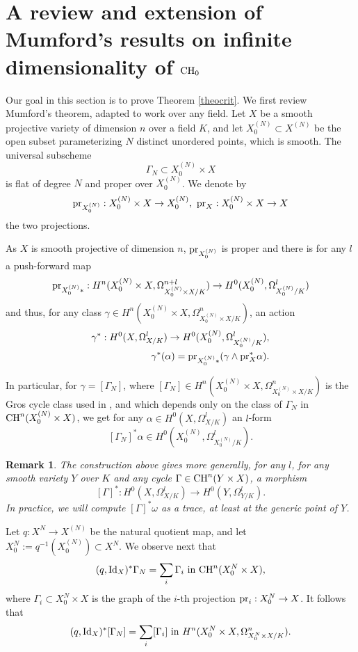 \documentclass[10pt]{article}
\newtheorem{rema}[theo]{Remark}
\begin{document}
\section{\label{secmumford} A review and extension of Mumford's results on infinite dimensionality  of ${\rm CH}_0$}
Our goal in this section is to prove Theorem  \ref{theocrit}.
We first  review  Mumford's theorem, adapted  to work over any field.   Let $X$ be  a smooth projective variety of dimension $n$ over a field $K$,  and let $X^{(N)}_0\subset X^{(N)}$ be the  open subset parameterizing $N$ distinct unordered points, which is smooth. The universal subscheme
$$\Gamma_N\subset X^{(N)}_0\times X$$
 is flat of degree $N$ and proper  over $X^{(N)}_0$. We denote by
$${\rm pr}_{X^{(N)}_0}: X^{(N)}_0\times X\rightarrow X^{(N)}_0 ,\,\,{\rm pr}_{X}: X^{(N)}_0\times X\rightarrow X$$
the two projections.

As $X$ is smooth projective of dimension $n$, ${\rm pr}_{X^{(N)}_0}$ is proper and  there is for any $l$ a push-forward map
$${\rm pr}_{X^{(N)}_0*}: H^{n}(X^{(N)}_0\times X,\Omega_{X^{(N)}_0\times X/K}^{n+l})\rightarrow H^0(X^{(N)}_0,\Omega_{X^{(N)}_0/K}^l)$$
and thus,  for any class $\gamma\in H^n(X^{(N)}_0\times X,\Omega_{X^{(N)}_0\times X/K}^n)$, an action
\begin{eqnarray}\label{eqvanGammaUdolb} \gamma^*: H^0(X,\Omega_{X/K}^{l})\rightarrow H^0(X^{(N)}_0,\Omega_{X^{(N)}_0/K}^l),\\
\nonumber
\gamma^*(\alpha)={\rm pr}_{X^{(N)}_{0}*}(\gamma\wedge {\rm pr}_X^*\alpha).
\end{eqnarray}

In particular, for $\gamma=[\Gamma_N]$, where $[\Gamma_N]\in H^n(X^{(N)}_0\times X,\Omega_{X^{(N)}_0\times X/K}^n)$ is the Gros  cycle class used in \cite{totaro}, and which depends only on the class of $\Gamma_N$ in ${\rm CH}^n(X^{(N)}_0\times X )$, we get for any $\alpha\in H^0(X,\Omega_{X/K}^{l})$ an $l$-form
$$[\Gamma_N]^*\alpha\in H^0(X^{(N)}_0,\Omega_{X^{(N)}_0/K}^l).$$

\begin{rema}\label{rematrace} {\rm  The construction above gives more generally, for any $l$, for any smooth variety $Y$ over $K$ and any cycle $\Gamma\in{\rm CH}^n (Y\times X)$, a morphism
$$[\Gamma]^*: H^0(X,\Omega_{X/K}^l)\rightarrow  H^0(Y,\Omega_{Y/K}^l).$$
In practice, we will compute $[\Gamma]^*\omega$ as a trace, at least at the generic point of $Y$.}
\end{rema}
 Let  $q:X^N\rightarrow X^{(N)}$ be the natural quotient map, and let $X^N_0:=q^{-1}(X^{(N)}_0)\subset X^N$.
We observe next  that
$$ (q,{\rm Id}_X)^*\Gamma_N=\sum_i\Gamma_i\,\,{\rm in}\,\,{\rm CH}^n(X^N_0\times X),$$
where $\Gamma_i\subset X^N_0\times X$ is the graph of the $i$-th projection ${\rm pr}_i: X^N_0\rightarrow X$.
It follows that
\begin{eqnarray}\label{eqpareilpourcrchet} (q,{\rm Id}_X)^*[\Gamma_N]=\sum_i[\Gamma_i] \,\,{\rm in}\,\,H^n(X^N_0\times X,\Omega_{X^N_0\times X/K}^n).
\end{eqnarray}
\end{document}
